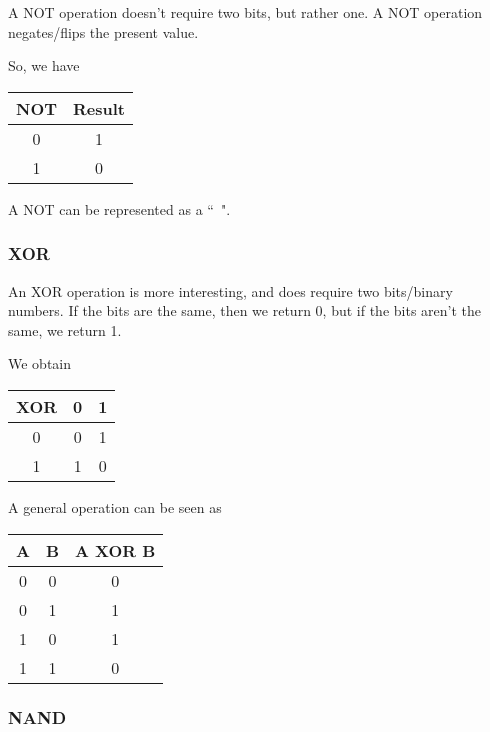 \documentclass[12pt]{article}
\begin{document}
A NOT operation doesn't require two bits, but rather one. A NOT operation
negates/flips the present value.

So, we have

\begin{center}
    \begin{tabular}{|c|c|}
      \hline
      NOT & Result \\
      \hline
      0 & 1 \\
      \hline
      1 & 0 \\
      \hline
    \end{tabular}
\end{center}

A NOT can be represented as a ``~".
     
\subsubsection{XOR}

An XOR operation is more interesting, and does require two bits/binary numbers.
If the bits are the same, then we return 0, but if the bits aren't the same, we return 1.

We obtain

\begin{center}
    \begin{tabular}{|c|c|c|}
      \hline
      XOR & 0 & 1 \\
      \hline
      0 & 0 & 1 \\
      \hline
      1 & 1 & 0 \\
      \hline
    \end{tabular}
\end{center}

A general operation can be seen as

\begin{center}
    \begin{tabular}{|c|c|c|}
      \hline
      A & B & A XOR B\\
      \hline
      0 & 0 & 0 \\
      \hline
      0 & 1 & 1 \\
      \hline
      1 & 0 & 1 \\
      \hline
      1 & 1 & 0 \\
      \hline
    \end{tabular}
\end{center}

\subsubsection{NAND}
\end{document}
